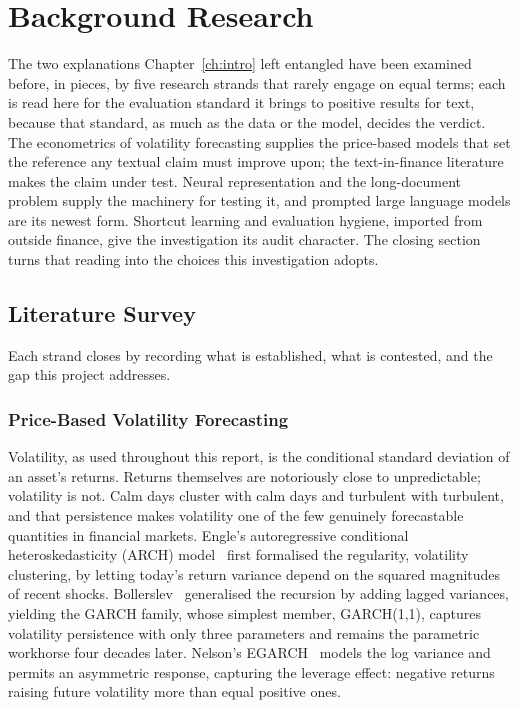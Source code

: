 \chapter{Background Research}
\label{ch:background}


The two explanations Chapter~\ref{ch:intro} left entangled have been examined before, in pieces, by five research strands that rarely engage on equal terms; each is read here for the evaluation standard it brings to positive results for text, because that standard, as much as the data or the model, decides the verdict. The econometrics of volatility forecasting supplies the price-based models that set the reference any textual claim must improve upon; the text-in-finance literature makes the claim under test. Neural representation and the long-document problem supply the machinery for testing it, and prompted large language models are its newest form. Shortcut learning and evaluation hygiene, imported from outside finance, give the investigation its audit character. The closing section turns that reading into the choices this investigation adopts.

\section{Literature Survey}
\label{sec:bg-survey}

Each strand closes by recording what is established, what is contested, and the gap this project addresses.

\subsection{Price-Based Volatility Forecasting}
\label{sec:bg-price}

Volatility, as used throughout this report, is the conditional standard deviation of an asset's returns. Returns themselves are notoriously close to unpredictable; volatility is not. Calm days cluster with calm days and turbulent with turbulent, and that persistence makes volatility one of the few genuinely forecastable quantities in financial markets. Engle's autoregressive conditional heteroskedasticity (ARCH) model~\cite{engle1982arch} first formalised the regularity, volatility clustering, by letting today's return variance depend on the squared magnitudes of recent shocks. Bollerslev~\cite{bollerslev1986garch} generalised the recursion by adding lagged variances, yielding the GARCH family, whose simplest member, GARCH(1,1), captures volatility persistence with only three parameters %
and remains the parametric workhorse four decades later. Nelson's EGARCH~\cite{nelson1991egarch} models the log variance and permits an asymmetric response, capturing the leverage effect: negative returns raising future volatility more than equal positive ones.

